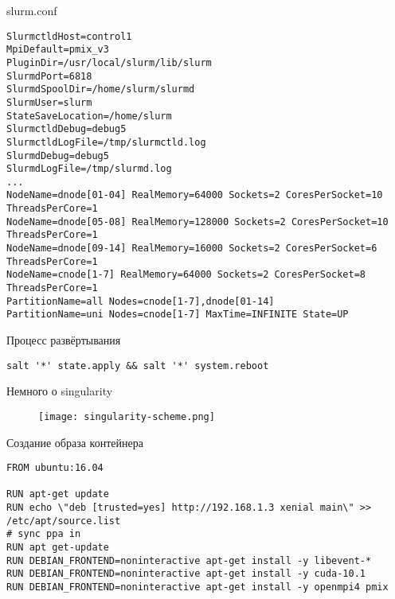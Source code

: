 \documentclass{beamer}
\begin{document}
\begin{frame}[fragile]{slurm.conf}

\begin{verbatim}
SlurmctldHost=control1
MpiDefault=pmix_v3
PluginDir=/usr/local/slurm/lib/slurm
SlurmdPort=6818
SlurmdSpoolDir=/home/slurm/slurmd
SlurmUser=slurm
StateSaveLocation=/home/slurm
SlurmctldDebug=debug5
SlurmctldLogFile=/tmp/slurmctld.log
SlurmdDebug=debug5
SlurmdLogFile=/tmp/slurmd.log
...
NodeName=dnode[01-04] RealMemory=64000 Sockets=2 CoresPerSocket=10 ThreadsPerCore=1
NodeName=dnode[05-08] RealMemory=128000 Sockets=2 CoresPerSocket=10 ThreadsPerCore=1
NodeName=dnode[09-14] RealMemory=16000 Sockets=2 CoresPerSocket=6 ThreadsPerCore=1 
NodeName=cnode[1-7] RealMemory=64000 Sockets=2 CoresPerSocket=8 ThreadsPerCore=1
PartitionName=all Nodes=cnode[1-7],dnode[01-14]
PartitionName=uni Nodes=cnode[1-7] MaxTime=INFINITE State=UP
\end{verbatim}
    
\end{frame}

\begin{frame}[fragile]{Процесс развёртывания}
\centering
\begin{verbatim}
salt '*' state.apply && salt '*' system.reboot
\end{verbatim}
\end{frame}

\begin{frame}{Немного о singularity}
 \begin{figure}
    \texttt{[image: singularity-scheme.png]}
\end{figure}   
\end{frame}

\begin{frame}[fragile]{Создание образа контейнера}
\begin{verbatim}
FROM ubuntu:16.04

RUN apt-get update
RUN echo \"deb [trusted=yes] http://192.168.1.3 xenial main\" >> /etc/apt/source.list
# sync ppa in
RUN apt get-update
RUN DEBIAN_FRONTEND=noninteractive apt-get install -y libevent-*
RUN DEBIAN_FRONTEND=noninteractive apt-get install -y cuda-10.1
RUN DEBIAN_FRONTEND=noninteractive apt-get install -y openmpi4 pmix
\end{verbatim}
\end{frame}
\end{document}
